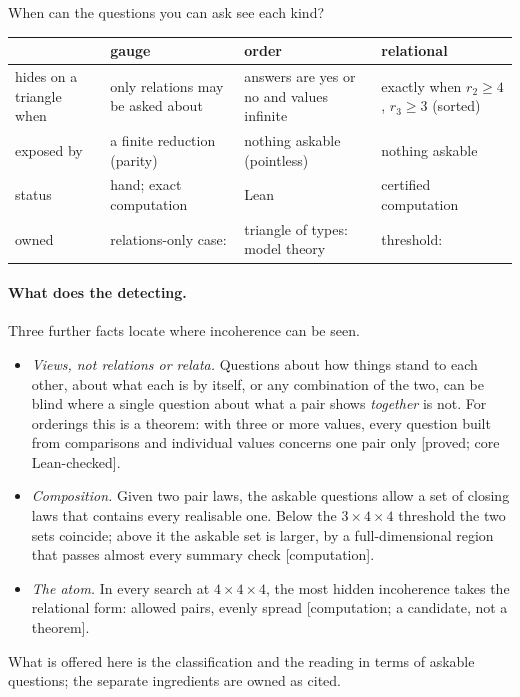 \documentclass[11pt]{article}
\newcommand{\st}[1]{\textsf{\small[#1]}}
\begin{document}
\noindent When can the questions you can ask see each kind?
\begin{center}\small
\begin{tabular}{|>{\raggedright\arraybackslash}p{2.6cm}|>{\raggedright\arraybackslash}p{3.6cm}|>{\raggedright\arraybackslash}p{3.6cm}|>{\raggedright\arraybackslash}p{3.4cm}|}
\hline
 & \textbf{gauge} & \textbf{order} & \textbf{relational}\\\hline
hides on a triangle when & only relations may be asked about & answers are yes or no and values infinite & exactly when $r_2\ge4$, $r_3\ge3$ (sorted)\\\hline
exposed by & a finite reduction (parity) & nothing askable (pointless) & nothing askable\\\hline
status & hand; exact computation & Lean & certified computation\\\hline
owned & relations-only case: \cite{draveckysipos1980} & triangle of types: model theory & threshold: \cite{sullivant2006,ohsugihibi2010}\\\hline
\end{tabular}
\end{center}

\paragraph{What does the detecting.} Three further facts locate where
incoherence can be seen.
\begin{itemize}[nosep]
  \item \emph{Views, not relations or relata.} Questions about how things stand
    to each other, about what each is by itself, or any combination of the two,
    can be blind where a single question about what a pair shows \emph{together}
    is not. For orderings this is a theorem: with three or more values, every
    question built from comparisons and individual values concerns one pair only
    \st{proved; core Lean-checked}.
  \item \emph{Composition.} Given two pair laws, the askable questions allow a
    set of closing laws that contains every realisable one. Below the
    $3\times4\times4$ threshold the two sets coincide; above it the askable set
    is larger, by a full-dimensional region that passes almost every summary
    check \st{computation}.
  \item \emph{The atom.} In every search at $4\times4\times4$, the most hidden
    incoherence takes the relational form: allowed pairs, evenly spread
    \st{computation; a candidate, not a theorem}.
\end{itemize}
What is offered here is the classification and the reading in terms of
askable questions; the separate ingredients are owned as cited.
\end{document}
